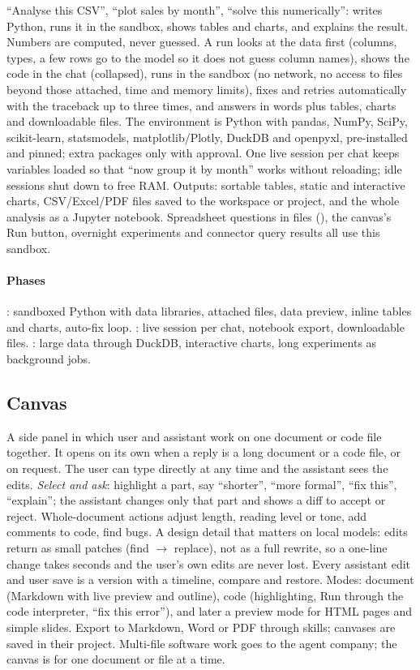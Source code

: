 ``Analyse this CSV'', ``plot sales by month'', ``solve this numerically'': \hivi{} writes Python, runs it in the sandbox, shows tables and charts, and explains the result. Numbers are computed, never guessed. A run looks at the data first (columns, types, a few rows go to the model so it does not guess column names), shows the code in the chat (collapsed), runs in the sandbox (no network, no access to files beyond those attached, time and memory limits), fixes and retries automatically with the traceback up to three times, and answers in words plus tables, charts and downloadable files. The environment is Python with pandas, NumPy, SciPy, scikit-learn, statsmodels, matplotlib/Plotly, DuckDB and openpyxl, pre-installed and pinned; extra packages only with approval. One live session per chat keeps variables loaded so that ``now group it by month'' works without reloading; idle sessions shut down to free RAM. Outputs: sortable tables, static and interactive charts, CSV/Excel/PDF files saved to the workspace or project, and the whole analysis as a Jupyter notebook. Spreadsheet questions in files (), the canvas's Run button, overnight experiments and connector query results all use this sandbox.

\paragraph{Phases} : sandboxed Python with data libraries, attached files, data preview, inline tables and charts, auto-fix loop. : live session per chat, notebook export, downloadable files. : large data through DuckDB, interactive charts, long experiments as background jobs.

\subsection{Canvas}

A side panel in which user and assistant work on one document or code file together. It opens on its own when a reply is a long document or a code file, or on request. The user can type directly at any time and the assistant sees the edits. \emph{Select and ask}: highlight a part, say ``shorter'', ``more formal'', ``fix this'', ``explain''; the assistant changes only that part and shows a diff to accept or reject. Whole-document actions adjust length, reading level or tone, add comments to code, find bugs. A design detail that matters on local models: edits return as small patches (find $\rightarrow$ replace), not as a full rewrite, so a one-line change takes seconds and the user's own edits are never lost. Every assistant edit and user save is a version with a timeline, compare and restore. Modes: document (Markdown with live preview and outline), code (highlighting, Run through the code interpreter, ``fix this error''), and later a preview mode for HTML pages and simple slides. Export to Markdown, Word or PDF through skills; canvases are saved in their project. Multi-file software work goes to the agent company; the canvas is for one document or file at a time.

